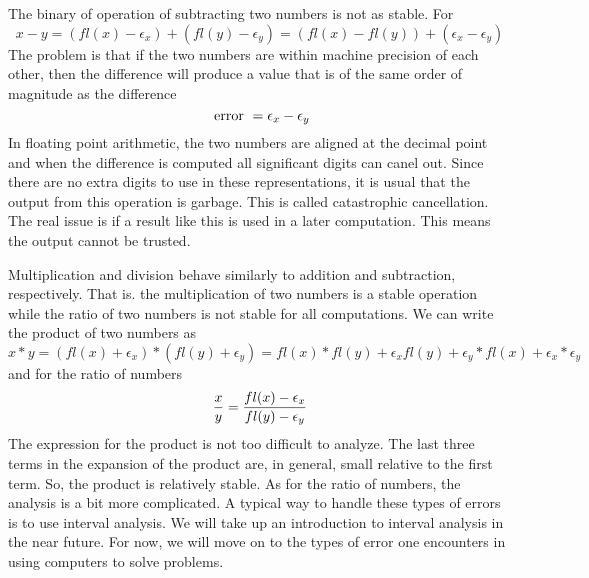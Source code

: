 \documentclass[10pt,fleqn]{article}
\begin{document}
The binary of operation of subtracting two numbers is not as stable. For
\[
   x - y = ( fl(x) - \epsilon_x ) + ( fl(y) - \epsilon_y )
         = ( fl(x) - fl(y) ) + ( \epsilon_x - \epsilon_y )
\]
The problem is that if the two numbers are within machine precision of each
other, then the difference will produce a value that is of the same order of
magnitude as the difference
\[
  \makebox{ error } = \epsilon_x - \epsilon_y
\]
In floating point arithmetic, the two numbers are aligned at the decimal point
and when the difference is computed all significant digits can canel out. Since
there are no extra digits to use in these representations, it is usual that the
output from this operation is garbage. This is called catastrophic cancellation.
The real issue is if a result like this is used in a later computation. This
means the output cannot be trusted.

Multiplication and division behave similarly to addition and subtraction,
respectively. That is. the multiplication of two numbers is a stable operation
while the ratio of two numbers is not stable for all computations. We can write
the product of two numbers as
\[
   x * y = ( fl(x) + \epsilon_x ) * ( fl(y) + \epsilon_y )
         = fl(x) * fl(y) + \epsilon_x fl(y) + \epsilon_y * fl(x)
                                          + \epsilon_x * \epsilon_y
\]
and for the ratio of numbers
\[
   {x \over y} = {{ fl(x) - \epsilon_x }\over{ fl(y) - \epsilon_y }}
\]
The expression for the product is not too difficult to analyze. The last three
terms in the expansion of the product are, in general, small relative to the
first term. So, the product is relatively stable. As for the ratio of numbers,
the analysis is a bit more complicated. A typical way to handle these types of
errors is to use interval analysis. We will take up an introduction to interval
analysis in the near future. For now, we will move on to the types of error one
encounters in using computers to solve problems.
\end{document}
